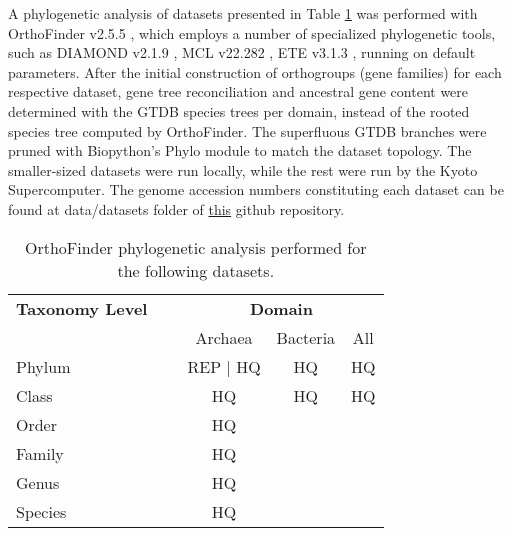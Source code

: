 A phylogenetic analysis of datasets presented in Table \ref{datasets} was performed with OrthoFinder v2.5.5 \cite{emms2019,emms2015}, which employs a number of specialized phylogenetic tools, such as DIAMOND v2.1.9 \cite{buchfink2021}, MCL v22.282 \cite{vandongen2008}, ETE v3.1.3 \cite{huerta-cepas2016}, running on default parameters. After the initial construction of orthogroups (gene families) for each respective dataset, gene tree reconciliation and ancestral gene content were determined with the GTDB species trees per domain, instead of the rooted species tree computed by OrthoFinder. The superfluous GTDB branches were pruned with Biopython's Phylo module to match the dataset topology. The smaller-sized datasets were run locally, while the rest were run by the Kyoto Supercomputer. The genome accession numbers constituting each dataset can be found at data/datasets folder of \href{https://github.com/astrademertzi/metnetexp_report}{this} github repository.


\normalsize
\begin{table}
    \centering
    \caption{OrthoFinder phylogenetic analysis performed for \\the following datasets.}
    \label{datasets}
    \begin{tabular}{lcccc}

        \textbf{Taxonomy Level} & ~ & \multicolumn{3}{c}{\textbf{Domain}} \\
        \addlinespace[1.5ex]

        ~ & ~ & Archaea & Bacteria & All \\ 
        \cmidrule{3-5}

        Phylum & ~ & REP | HQ &  HQ & HQ \\ 
        Class & ~ &  HQ &  HQ &  HQ \\ 
        Order & ~ & HQ & ~ & ~ \\ 
        Family & ~ & HQ & ~ & ~ \\ 
        Genus & ~ & HQ & ~ & ~ \\ 
        Species & ~ & HQ & ~ & ~ \\

    \bottomrule
    \end{tabular}
\end{table}


